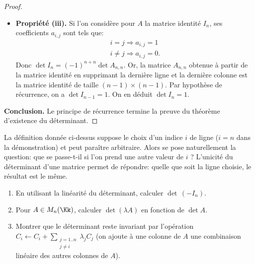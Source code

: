 \documentclass[class=report,crop=false]{standalone}
\begin{document}
\begin{proof}
\begin{itemize}
  \item \textbf{Propriété (iii).}
Si l'on considère pour $A$ la matrice identité $I_n$, ses coefficients $a_{i,j}$ sont tels que:
$$\begin{array}{l}
i=j \Longrightarrow a_{i,j}=1\\
i \neq j \Longrightarrow a_{i,j}=0.
\end{array}$$
Donc $\det I_n = (-1)^{n+n}\det A_{n,n} $. Or, la matrice $A_{n,n}$ obtenue
à partir de la matrice identité en supprimant la dernière ligne et
la dernière colonne est la matrice identité de taille $(n-1)\times(n-1)$.
Par hypothèse de récurrence, on a $\det I_{n-1} = 1$. On en déduit $\det I_n = 1$.

\end{itemize}

\medskip

\textbf{Conclusion.}
Le principe de récurrence termine la preuve du théorème d'existence
du déterminant.
\end{proof}

\begin{remarque*}
La définition donnée ci-dessus suppose le choix d'un indice $i$ de ligne
($i=n$ dans la démonstration) et peut paraître arbitraire. Alors se pose naturellement
la question: que se passe-t-il si l'on prend une autre valeur de $i$ ?
L'unicité du déterminant d'une matrice permet de répondre: quelle que
soit la ligne choisie, le résultat est le même.
\end{remarque*}






\begin{miniexercices}
\sauteligne
\begin{enumerate}
  \item En utilisant la linéarité du déterminant, calculer $\det \, (-I_n)$.

  \item Pour $A \in M_n(\Kk)$, calculer $\det (\lambda A)$
  en fonction de $\det A$.

  \item Montrer que le déterminant reste invariant par l'opération
  $C_i \leftarrow C_i+\sum_{{\substack{j=1..n \\ j\neq i}}}\lambda_j C_j$
  (on ajoute à une colonne de $A$ une combinaison linéaire des autres colonnes de $A$).

\end{enumerate}
\end{miniexercices}
\end{document}
